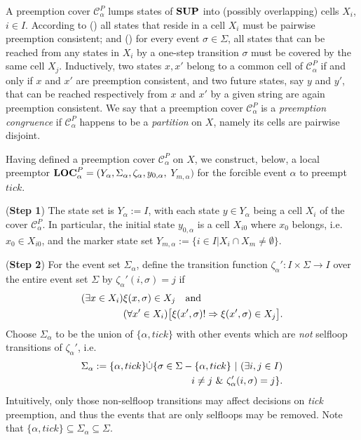 \documentclass[twocolumn]{autart}
\newcommand{\rmnum}[1]{\romannumeral #1}
\begin{document}
A preemption cover $\mathcal{C}^P_{\alpha}$ lumps states of $\bf
SUP$ into (possibly overlapping) cells $X_i$, $i\in I$. According to
(\rmnum{1}) all states that reside in a cell $X_i$ must be pairwise
preemption consistent; and (\rmnum{2}) for every event $\sigma\in
\Sigma$, all states that can be reached from any states in $X_i$ by
a one-step transition $\sigma$ must be covered by the same cell
$X_j$. Inductively, two states $x,x'$ belong to a common cell of
$\mathcal{C}^P_{\alpha}$ if and only if { $x$ and $x'$
are preemption consistent, and two future states, say $y$ and $y'$,
that can be reached respectively from $x$ and $x'$ by a given string
are again preemption consistent.} We say that a preemption cover
$\mathcal{C}^P_{\alpha}$ is a {\it preemption congruence} if
$\mathcal{C}^P_{\alpha}$ happens to be a {\it partition} on $X$,
namely its cells are pairwise disjoint.

Having defined a preemption cover $\mathcal{C}^P_{\alpha}$ on $X$,
we construct, below, a local preemptor ${\bf LOC}^P_{\alpha} =
(Y_\alpha, \Sigma_\alpha, \zeta_\alpha, y_{0,\alpha},$
$Y_{m,\alpha})$ for the forcible event $\alpha$ to preempt $tick$.

({\bf Step 1}) The state set is $Y_\alpha := I$, with each state $y
\in Y_\alpha$ being a cell $X_i$ of the cover
$\mathcal{C}^P_{\alpha}$. In particular, the initial state
$y_{0,\alpha}$ is a cell $X_{i0}$ where $x_0$ belongs, i.e. $x_0 \in
X_{i0}$, and the marker state set $Y_{m,\alpha}:=\{i\in I|X_i\cap
X_m \neq \emptyset\}$.

({\bf Step 2}) For the event set $\Sigma_\alpha$, define the
transition function $\zeta_\alpha':I\times\Sigma \rightarrow I$ over
the entire event set $\Sigma$ by $\zeta_\alpha'(i,\sigma)=j$ if
\begin{align} \label{e277}
(\exists x\in X_i)&\xi(x,\sigma)\in X_j \mbox{\ \ \ and \ \ \ }\notag\\
&(\forall x'\in X_i)\big[\xi(x',\sigma)! \Rightarrow
\xi(x',\sigma)\in X_j\big].
\end{align}
Choose $\Sigma_\alpha$ to be the union of $\{\alpha, tick\}$ with
other events which are {\it not} selfloop transitions of
$\zeta_\alpha'$, i.e.
\begin{align}\label{e27}
\Sigma_\alpha :=  \{\alpha, tick\}\dot\cup \{\sigma \in \Sigma -
\{\alpha, tick\} \ | \ (\exists i,j \in I) \notag\\
i \neq j \ \& \
\zeta_\alpha'(i,\sigma) = j\}.
\end{align}
Intuitively, only those non-selfloop transitions may
affect decisions on \emph{tick} preemption, and thus the events that
are only selfloops may be removed. Note that $\{\alpha,
tick\}\subseteq\Sigma_\alpha \subseteq \Sigma$.
\end{document}
